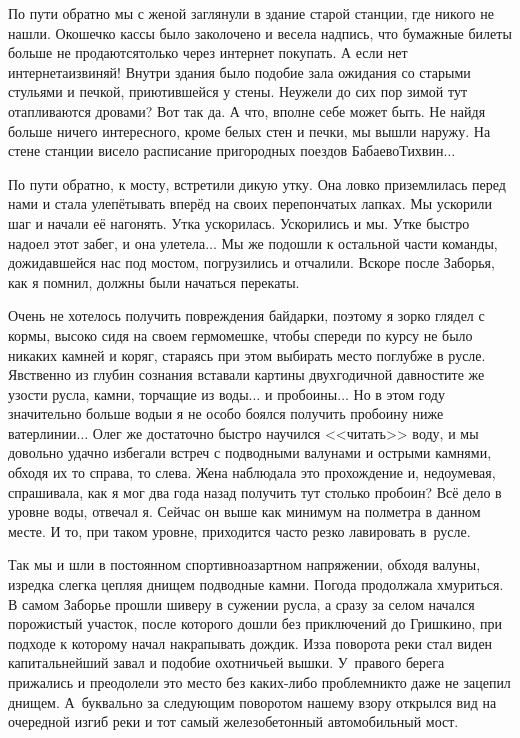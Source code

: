 По пути обратно мы с женой заглянули в здание старой станции, где никого не нашли. Окошечко кассы было заколочено и весела надпись, что бумажные билеты больше не продаются\mdash только через интернет покупать. А если нет интернета\mdash извиняй! Внутри здания было подобие зала ожидания со старыми стульями и печкой, приютившейся у стены. Неужели до сих пор зимой тут отапливаются дровами? Вот так да. А что, вполне себе может быть. Не найдя больше ничего интересного, кроме белых стен и печки, мы вышли наружу. На стене станции висело расписание пригородных поездов Бабаево\sdash Тихвин$\ldots$ 

По пути обратно, к мосту, встретили дикую утку. Она ловко приземлилась перед нами и стала улепётывать вперёд на своих перепончатых лапках. Мы ускорили шаг и начали её нагонять. Утка ускорилась. Ускорились и мы. Утке быстро надоел этот забег, и она улетела$\ldots$ Мы же подошли к остальной части команды, дожидавшейся нас под мостом, погрузились и отчалили. Вскоре после Заборья, как я помнил, должны были начаться перекаты.

Очень не хотелось получить повреждения байдарки, поэтому я зорко глядел с кормы, высоко сидя на своем гермомешке, чтобы спереди по курсу не было никаких камней и коряг, стараясь при этом выбирать место поглубже в русле. Явственно из глубин сознания вставали картины двухгодичной давности\mdash те же узости русла, камни, торчащие из воды$\ldots$ и пробоины$\ldots$ Но в этом году значительно больше воды\mdash и я не особо боялся получить пробоину ниже ватерлинии$\ldots$ Олег же достаточно быстро научился <<читать>> воду, и мы довольно удачно избегали встреч с подводными валунами и острыми камнями, обходя их то справа, то слева. Жена наблюдала это прохождение и, недоумевая, спрашивала, как я мог два года назад получить тут столько пробоин? Всё дело в уровне воды, отвечал я. Сейчас он выше как минимум на полметра в данном месте. И то, при таком уровне, приходится часто резко лавировать в~русле. 

Так мы и шли в постоянном спортивно\sdash азартном напряжении, обходя валуны, изредка слегка цепляя днищем подводные камни. Погода продолжала хмуриться. В самом Заборье прошли шиверу в сужении русла, а сразу за селом начался порожистый участок, после которого дошли без приключений до Гришкино, при подходе к которому начал накрапывать дождик. Из\sdash за поворота реки стал виден капитальнейший завал и подобие охотничьей вышки. У~правого берега прижались и преодолели это место без каких-либо проблем\mdash никто даже не зацепил днищем. А~буквально за следующим поворотом нашему взору открылся вид на очередной изгиб реки и тот самый железобетонный автомобильный мост. 

